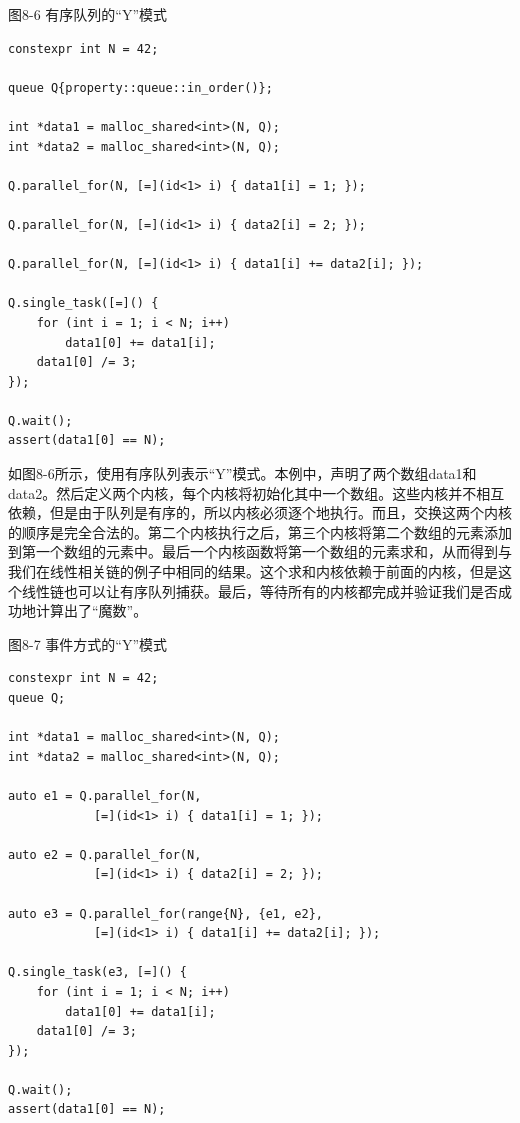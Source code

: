 \hspace*{\fill} \par %
图8-6 有序队列的“Y”模式
\begin{lstlisting}[caption={}]
constexpr int N = 42;

queue Q{property::queue::in_order()};

int *data1 = malloc_shared<int>(N, Q);
int *data2 = malloc_shared<int>(N, Q);

Q.parallel_for(N, [=](id<1> i) { data1[i] = 1; });

Q.parallel_for(N, [=](id<1> i) { data2[i] = 2; });

Q.parallel_for(N, [=](id<1> i) { data1[i] += data2[i]; });

Q.single_task([=]() {
	for (int i = 1; i < N; i++)
		data1[0] += data1[i];
	data1[0] /= 3;
});

Q.wait();
assert(data1[0] == N);
\end{lstlisting}

如图8-6所示，使用有序队列表示“Y”模式。本例中，声明了两个数组data1和data2。然后定义两个内核，每个内核将初始化其中一个数组。这些内核并不相互依赖，但是由于队列是有序的，所以内核必须逐个地执行。而且，交换这两个内核的顺序是完全合法的。第二个内核执行之后，第三个内核将第二个数组的元素添加到第一个数组的元素中。最后一个内核函数将第一个数组的元素求和，从而得到与我们在线性相关链的例子中相同的结果。这个求和内核依赖于前面的内核，但是这个线性链也可以让有序队列捕获。最后，等待所有的内核都完成并验证我们是否成功地计算出了“魔数”。\par

\hspace*{\fill} \par %
图8-7 事件方式的“Y”模式
\begin{lstlisting}[caption={}]
constexpr int N = 42;
queue Q;

int *data1 = malloc_shared<int>(N, Q);
int *data2 = malloc_shared<int>(N, Q);

auto e1 = Q.parallel_for(N, 
			[=](id<1> i) { data1[i] = 1; });

auto e2 = Q.parallel_for(N, 
			[=](id<1> i) { data2[i] = 2; });

auto e3 = Q.parallel_for(range{N}, {e1, e2},
			[=](id<1> i) { data1[i] += data2[i]; });
	
Q.single_task(e3, [=]() {
	for (int i = 1; i < N; i++)
		data1[0] += data1[i];
	data1[0] /= 3;
});

Q.wait();
assert(data1[0] == N);
\end{lstlisting}

